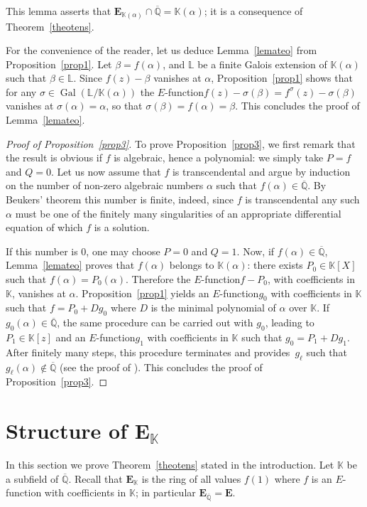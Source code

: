 \documentclass[JEP,XML,SOM,Unicode,published]{cedram}
\newcommand{\Efunction}{$E$\nobreakdash-func\-tion\xspace}
\theoremstyle{definition}
\newcommand{\K}{\mathbb{K}}
\renewcommand{\L}{\mathbb{L}}
\newcommand{\EE}{{\mathbf E}}
\newcommand{\Qbar}{\overline{\mathbb Q}}
\newcommand{\EK}{\EE_{\K}}
\newcommand{\EQbar}{\EE_{\Qbar}}
\DeclareMathOperator{\Gal}{Gal}
\begin{document}
This lemma asserts that $\EE_{\K(\alpha)}\cap\Qbar=\K(\alpha)$; it is a consequence of Theorem~\ref{theotens}.

For the convenience of the reader, let us deduce Lemma~\ref{lemateo} from Proposition~\ref{prop1}. Let $\beta = f(\alpha)$, and $\L$ be a finite Galois extension of $\K(\alpha)$ such that $\beta\in\L$. Since $f(z)-\beta$ vanishes at $\alpha$, Proposition~\ref{prop1} shows that for any $\sigma\in \Gal(\L/\K(\alpha))$
the \Efunction $f(z)-\sigma(\beta) = f^\sigma(z)-\sigma(\beta) $ vanishes at $\sigma(\alpha)=\alpha$, so that $ \sigma(\beta) =f(\alpha) = \beta$.
This concludes the proof of Lemma~\ref{lemateo}.

\begin{proof}[Proof of Proposition~\ref{prop3}] To prove Proposition~\ref{prop3}, we first remark that the result is obvious if $f$ is algebraic, hence a polynomial: we simply take $P=f$ and $Q=0$. Let us now assume that $f$ is transcendental and argue by induction on the number of non-zero algebraic numbers $\alpha$ such that $f(\alpha)\in \Qbar$. By Beukers' theorem this number is finite, indeed, since $f$ is transcendental any such
$\alpha$ must be one of the finitely many singularities of an appropriate differential equation of which $f$ is a solution.

If this number is 0, one may choose $P=0$ and $Q=1$. Now, if $f(\alpha)\in \Qbar$, Lemma~\ref{lemateo} proves that $ f(\alpha)$ belongs to $\K(\alpha) $: there exists $P_0\in\K[X]$ such that $ f(\alpha) = P_0(\alpha)$. Therefore the \Efunction $f-P_0$, with coefficients in $\K$, vanishes at $\alpha$. Proposition~\ref{prop1} yields an \Efunction $g_0$ with coefficients in $\K$ such that $f = P_0 + D g_0$ where $D $ is the minimal polynomial of $\alpha$ over $\K$. If $g_0(\alpha)\in\Qbar$, the same procedure can be carried out with $g_0$, leading to $P_1\in\K[z]$ and an \Efunction $g_1$ with coefficients in $\K$ such that $g_0=P_1+Dg_1$. After finitely many steps, this procedure terminates and provides~$g_\ell$ such that $g_\ell(\alpha)\not\in\Qbar$ (see the proof of \cite[Th.\,3.4]{BRS2}). This concludes the proof of Proposition~\ref{prop3}. \end{proof}

\section{Structure of \texorpdfstring{$\EK$}{EK}} \label{sec5}

In this section we prove Theorem~\ref{theotens} stated in the introduction.
Let $\K$ be a subfield of $\Qbar$. Recall that $\EK$ is the ring of all values $f(1)$ where $f$ is an \Efunction with coefficients in $\K$; in particular $\EQbar = \EE$.
\end{document}
